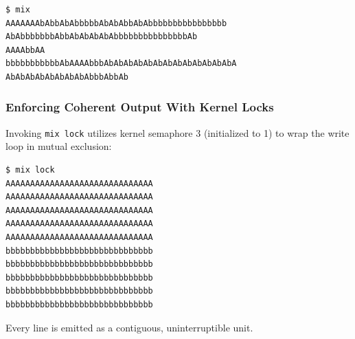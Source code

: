 \documentclass{labreport}
\begin{document}
\begin{lstlisting}[style=bash]
$ mix
AAAAAAAbAbbAbAbbbbbAbAbAbbAbAbbbbbbbbbbbbbbbb
AbAbbbbbbbAbbAbAbAbAbAbbbbbbbbbbbbbbbAb
AAAAbbAA
bbbbbbbbbbbAbAAAAbbbAbAbAbAbAbAbAbAbAbAbAbAbAbA
AbAbAbAbAbAbAbAbAbbbAbbAb
\end{lstlisting}

\subsubsection{Enforcing Coherent Output With Kernel Locks}
Invoking \texttt{mix lock} utilizes kernel semaphore 3 (initialized to 1) to wrap the write loop in mutual exclusion:

\begin{lstlisting}[style=bash]
$ mix lock
AAAAAAAAAAAAAAAAAAAAAAAAAAAAAA
AAAAAAAAAAAAAAAAAAAAAAAAAAAAAA
AAAAAAAAAAAAAAAAAAAAAAAAAAAAAA
AAAAAAAAAAAAAAAAAAAAAAAAAAAAAA
AAAAAAAAAAAAAAAAAAAAAAAAAAAAAA
bbbbbbbbbbbbbbbbbbbbbbbbbbbbbb
bbbbbbbbbbbbbbbbbbbbbbbbbbbbbb
bbbbbbbbbbbbbbbbbbbbbbbbbbbbbb
bbbbbbbbbbbbbbbbbbbbbbbbbbbbbb
bbbbbbbbbbbbbbbbbbbbbbbbbbbbbb
\end{lstlisting}
Every line is emitted as a contiguous, uninterruptible unit.
\end{document}

